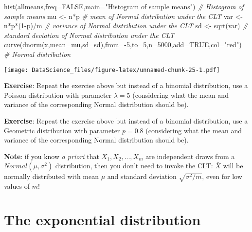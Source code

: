 \documentclass[
]{book}
\newenvironment{Shaded}{\begin{snugshade}}{\end{snugshade}}
\newcommand{\AttributeTok}[1]{\textcolor[rgb]{0.77,0.63,0.00}{#1}}
\newcommand{\CommentTok}[1]{\textcolor[rgb]{0.56,0.35,0.01}{\textit{#1}}}
\newcommand{\ConstantTok}[1]{\textcolor[rgb]{0.00,0.00,0.00}{#1}}
\newcommand{\DecValTok}[1]{\textcolor[rgb]{0.00,0.00,0.81}{#1}}
\newcommand{\FunctionTok}[1]{\textcolor[rgb]{0.00,0.00,0.00}{#1}}
\newcommand{\NormalTok}[1]{#1}
\newcommand{\OtherTok}[1]{\textcolor[rgb]{0.56,0.35,0.01}{#1}}
\newcommand{\SpecialCharTok}[1]{\textcolor[rgb]{0.00,0.00,0.00}{#1}}
\newcommand{\StringTok}[1]{\textcolor[rgb]{0.31,0.60,0.02}{#1}}
\begin{document}
\begin{Shaded}
\begin{Highlighting}[]
\FunctionTok{hist}\NormalTok{(allmeans,}\AttributeTok{freq=}\ConstantTok{FALSE}\NormalTok{,}\AttributeTok{main=}\StringTok{"Histogram of sample means"}\NormalTok{) }\CommentTok{\# Histogram of sample means}
\NormalTok{mu }\OtherTok{\textless{}{-}}\NormalTok{ n}\SpecialCharTok{*}\NormalTok{p }\CommentTok{\# mean of Normal distribution under the CLT}
\NormalTok{var }\OtherTok{\textless{}{-}}\NormalTok{ n}\SpecialCharTok{*}\NormalTok{p}\SpecialCharTok{*}\NormalTok{(}\DecValTok{1}\SpecialCharTok{{-}}\NormalTok{p)}\SpecialCharTok{/}\NormalTok{m }\CommentTok{\# variance of Normal distribution under the CLT}
\NormalTok{sd }\OtherTok{\textless{}{-}} \FunctionTok{sqrt}\NormalTok{(var) }\CommentTok{\# standard deviation of Normal distribution under the CLT}
\FunctionTok{curve}\NormalTok{(}\FunctionTok{dnorm}\NormalTok{(x,}\AttributeTok{mean=}\NormalTok{mu,}\AttributeTok{sd=}\NormalTok{sd),}\AttributeTok{from=}\SpecialCharTok{{-}}\DecValTok{5}\NormalTok{,}\AttributeTok{to=}\DecValTok{5}\NormalTok{,}\AttributeTok{n=}\DecValTok{5000}\NormalTok{,}\AttributeTok{add=}\ConstantTok{TRUE}\NormalTok{,}\AttributeTok{col=}\StringTok{"red"}\NormalTok{) }\CommentTok{\# Normal distribution}
\end{Highlighting}
\end{Shaded}

\texttt{[image: DataScience\_files/figure-latex/unnamed-chunk-25-1.pdf]}

\textbf{Exercise}: Repeat the exercise above but instead of a binomial
distribution, use a Poisson distribution with parameter \(\lambda=5\) (considering what the mean and variance of the corresponding Normal distribution should be).

\textbf{Exercise}: Repeat the exercise above but instead of a binomial distribution, use a Geometric distribution with parameter \(p=0.8\) (considering what the mean and variance of the corresponding Normal distribution should be).

\textbf{Note}: if you know \emph{a priori} that \(X_1, X_2, ..., X_m\) are independent draws from a \(Normal(\mu,\sigma^2)\) distribution, then you don't need to invoke the CLT: \(\bar{X}\) will be normally distributed with mean \(\mu\) and standard deviation \(\sqrt{\sigma^2 /m}\), even for low values of \(m\)!

\hypertarget{the-exponential-distribution}{%
\section{The exponential distribution}\label{the-exponential-distribution}}
\end{document}

